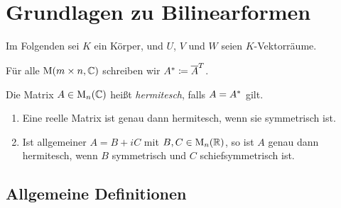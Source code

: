 \chapter{Grundlagen zu Bilinearformen}

Im Folgenden sei $K$ ein Körper, und $U$, $V$ und $W$ seien $K$-Vektorräume.

\begin{notation}
  Für alle $\operatorname{M}(m \times n, \mathbb{C})$ schreiben wir $A^* \coloneqq \overline{A}^T$.
\end{notation}

\begin{definition}
  Die Matrix $A \in \operatorname{M}_{n}(\mathbb{C})$ heißt \emph{hermitesch}, falls $A = A^*$ gilt.
\end{definition}

\begin{example}
  \leavevmode
  \begin{enumerate}
    \item
      Eine reelle Matrix ist genau dann hermitesch, wenn sie symmetrisch ist.
    \item
      Ist allgemeiner $A = B + iC$ mit $B, C \in \operatorname{M}_{n}(\mathbb{R})$, so ist $A$ genau dann hermitesch, wenn $B$ symmetrisch und $C$ schiefsymmetrisch ist.
  \end{enumerate}
\end{example}





\section{Allgemeine Definitionen}

